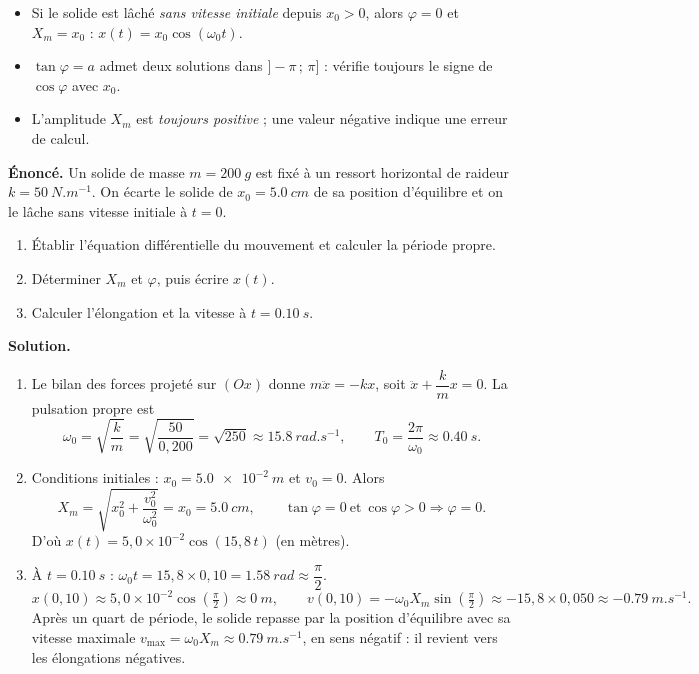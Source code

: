 \documentclass[11pt]{article}
\begin{document}
\begin{attention}
\begin{itemize}
\item Si le solide est lâché \emph{sans vitesse initiale} depuis $x_0 > 0$, alors $\varphi = 0$ et $X_m = x_0$ : $x(t) = x_0\cos(\omega_0 t)$.
\item $\tan\varphi = a$ admet deux solutions dans $]-\pi\,;\,\pi]$ : vérifie toujours le signe de $\cos\varphi$ avec $x_0$.
\item L'amplitude $X_m$ est \emph{toujours positive} ; une valeur négative indique une erreur de calcul.
\end{itemize}
\end{attention}

\begin{exoresolu}
\textbf{Énoncé.} Un solide de masse $m = \SI{200}{g}$ est fixé à un ressort horizontal de raideur $k = \SI{50}{N.m^{-1}}$. On écarte le solide de $x_0 = \SI{5,0}{cm}$ de sa position d'équilibre et on le lâche sans vitesse initiale à $t = 0$.
\begin{enumerate}
\item Établir l'équation différentielle du mouvement et calculer la période propre.
\item Déterminer $X_m$ et $\varphi$, puis écrire $x(t)$.
\item Calculer l'élongation et la vitesse à $t = \SI{0,10}{s}$.
\end{enumerate}
\tcblower
\textbf{Solution.}
\begin{enumerate}
\item Le bilan des forces projeté sur $(Ox)$ donne $m\ddot{x} = -kx$, soit $\ddot{x} + \dfrac{k}{m}x = 0$. La pulsation propre est
\[
\omega_0 = \sqrt{\frac{k}{m}} = \sqrt{\frac{50}{0,200}} = \sqrt{250} \approx \SI{15,8}{rad.s^{-1}},
\qquad
T_0 = \frac{2\pi}{\omega_0} \approx \SI{0,40}{s}.
\]
\item Conditions initiales : $x_0 = \SI{5,0e-2}{m}$ et $v_0 = 0$. Alors
\[
X_m = \sqrt{x_0^2 + \frac{v_0^2}{\omega_0^2}} = x_0 = \SI{5,0}{cm},
\qquad
\tan\varphi = 0 \ \text{et}\ \cos\varphi > 0 \Rightarrow \varphi = 0.
\]
D'où $x(t) = 5,0\times 10^{-2}\cos(15,8\,t)$ (en mètres).
\item À $t = \SI{0,10}{s}$ : $\omega_0 t = 15,8 \times 0,10 = \SI{1,58}{rad} \approx \dfrac{\pi}{2}$.
\[
x(0,10) \approx 5,0\times 10^{-2}\cos\!\left(\tfrac{\pi}{2}\right) \approx \SI{0}{m},
\qquad
v(0,10) = -\omega_0 X_m \sin\!\left(\tfrac{\pi}{2}\right) \approx -15,8 \times 0,050 \approx \SI{-0,79}{m.s^{-1}}.
\]
Après un quart de période, le solide repasse par la position d'équilibre avec sa vitesse maximale $v_{\max} = \omega_0 X_m \approx \SI{0,79}{m.s^{-1}}$, en sens négatif : il revient vers les élongations négatives.
\end{enumerate}
\end{exoresolu}
\end{document}
